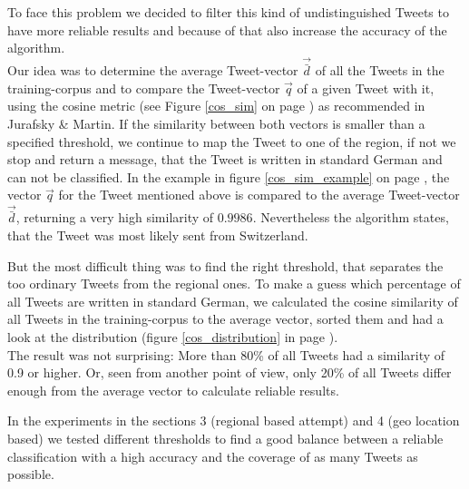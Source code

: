 \documentclass[../Main.tex]{subfiles}
\begin{document}
To face this problem we decided to filter this kind of undistinguished Tweets to have more reliable results and because of that also increase the accuracy of the algorithm. \\
Our idea was to determine the average Tweet-vector $\vec{\bar{d}}$ of all the Tweets in the training-corpus and to compare the Tweet-vector $\vec{q}$ of a given Tweet with it, using the cosine metric (see Figure \ref{cos_sim} on page \pageref{cos_sim}) as recommended  in Jurafsky \& Martin. If the similarity between both vectors is smaller than a specified threshold, we continue to map the Tweet to one of the region, if not we stop and return a message, that the Tweet is written in standard German and can not be classified. In the example in figure \ref{cos_sim_example} on page \pageref{cos_sim_example}, the vector $\vec{q}$ for the Tweet mentioned above is compared to the average Tweet-vector $\vec{\bar{d}}$, returning a very high similarity of $0.9986$. Nevertheless the algorithm states, that the Tweet was most likely sent from Switzerland. 

But the most difficult thing was to find the right threshold, that separates the too ordinary Tweets from the regional ones. To make a guess which percentage of all Tweets are written in standard German, we calculated the cosine similarity of all Tweets in the training-corpus to the average vector, sorted them and had a look at the distribution (figure \ref{cos_distribution} in page \pageref{cos_distribution}). \\
The result was not surprising: More than 80\% of all Tweets had a similarity of 0.9 or higher. Or, seen from another point of view, only 20\% of all Tweets differ enough from the average vector to calculate reliable results. 

In the experiments in the sections 3 (regional based attempt) and 4 (geo location based) we tested different thresholds to find a good balance between a reliable classification with a high accuracy and the coverage of as many Tweets as possible.
\end{document}
